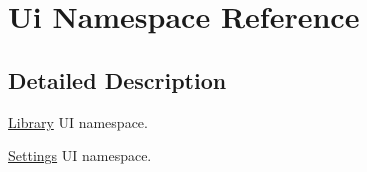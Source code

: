 \hypertarget{namespace_ui}{}\section{Ui Namespace Reference}
\label{namespace_ui}


\subsection{Detailed Description}
\hyperlink{class_library}{Library} U\+I namespace.

\hyperlink{class_settings}{Settings} U\+I namespace. 